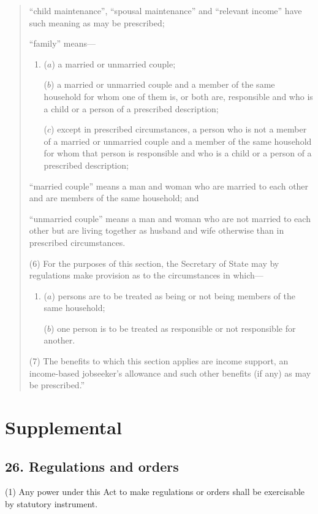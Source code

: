\documentclass[a4paper]{article}
\begin{document}
\begin{quotation}
\begin{enumerate}
“child maintenance”, “spousal maintenance” and “relevant income” have such meaning as may be prescribed;

“family” means—
\begin{enumerate}\item[]
($a$) a married or unmarried couple;

($b$) a married or unmarried couple and a member of the same household for whom one of them is, or both are, responsible and who is a child or a person of a prescribed description;

($c$) except in prescribed circumstances, a person who is not a member of a married or unmarried couple and a member of the same household for whom that person is responsible and who is a child or a person of a prescribed description;
\end{enumerate}

“married couple” means a man and woman who are married to each other and are members of the same household; and

“unmarried couple” means a man and woman who are not married to each other but are living together as husband and wife otherwise than in prescribed circumstances.
\end{enumerate}

(6) For the purposes of this section, the Secretary of State may by regulations make provision as to the circumstances in which—
\begin{enumerate}\item[]
($a$) persons are to be treated as being or not being members of the same household;

($b$) one person is to be treated as responsible or not responsible for another.
\end{enumerate}

(7) The benefits to which this section applies are income support, an income-based jobseeker’s allowance and such other benefits (if any) as may be prescribed.”
\end{quotation}

\section{Supplemental}

\subsection{26. Regulations and orders}

(1) Any power under this Act to make regulations or orders shall be exercisable by statutory instrument.
\end{document}
